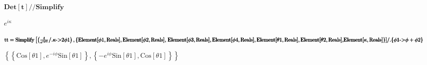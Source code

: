 \documentclass{article}
\begin{document}
\begin{doublespace}
\noindent\(\pmb{\text{Det}[t]\text{//}\text{Simplify}}\)
\end{doublespace}

\begin{doublespace}
\noindent\(e^{i \kappa }\)
\end{doublespace}

\begin{doublespace}
\noindent\(\pmb{\text{tt} = }\\
\pmb{\text{Simplify}\left[\left(\frac{t}{e^{i \text{$\phi $1}}}\text{/.}\kappa \text{-$>$}2\text{$\phi $1}\right),\{\text{Element}[\text{$\phi $1},\text{Reals}],\text{Element}[\text{$\phi
$2},\text{Reals}],\right.}\\
\pmb{\text{Element}[\text{$\phi $3},\text{Reals}],\text{Element}[\text{$\phi $4},\text{Reals}],\text{Element}[\text{$\theta $1},\text{Reals}],\text{Element}[\text{$\theta
$2},\text{Reals}],}\\
\pmb{\text{Element}[\kappa ,\text{Reals}]\}]\text{/.}\{\text{$\phi $1}\text{-$>$}\phi +\text{$\phi $2}\}}\)
\end{doublespace}

\begin{doublespace}
\noindent\(\left\{\left\{\text{Cos}[\text{$\theta $1}],e^{-i \phi } \text{Sin}[\text{$\theta $1}]\right\},\left\{-e^{i \phi } \text{Sin}[\text{$\theta
$1}],\text{Cos}[\text{$\theta $1}]\right\}\right\}\)
\end{doublespace}
\end{document}
